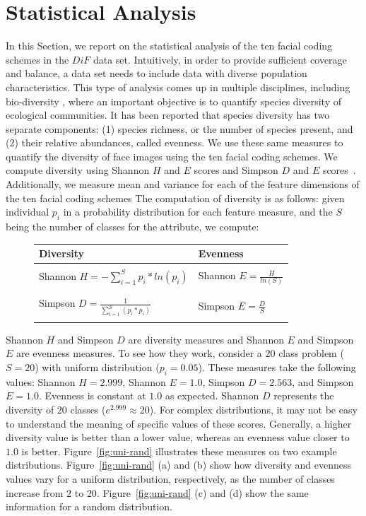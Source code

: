 \documentclass[letterpaper,11pt]{article}
\begin{document}
\section{Statistical Analysis} \label{sec:analysis}
In this Section, we report on the statistical analysis of the ten facial coding schemes in the $DiF$ data set.   Intuitively, in order to provide sufficient coverage and balance, a data set needs to include data with diverse population characteristics.  This type of analysis comes up in multiple disciplines, including bio-diversity \cite{heip_1998,hill_ecology_73}, where an important objective is to quantify species diversity of ecological communities.  It has been reported that species diversity has two separate components: (1) species richness, or the number of species present, and (2) their relative abundances, called evenness. We use these same measures to quantify the diversity of face images using the ten facial coding schemes.  We compute diversity using Shannon $H$ and $E$ scores and Simpson $D$ and $E$ scores~\cite{heip_1998}. Additionally, we measure mean and variance for each of the feature dimensions of the ten facial coding schemes  The computation of diversity is as follows: given individual $p_i$ in a probability distribution for each feature measure, and the $S$ being the number of classes for the attribute, we compute:

\begin{figure}[h]
\begin{center}
\begin{tabular}{ll}
\hline
\bf Diversity   & \bf Evenness \\\hline\\
Shannon $H = -\sum_{i=1}^{S} p_i *ln (p_i)$         &Shannon $E = \frac{H}{ln(S)}$\\\\\hline\\
Simpson $D = \frac{1}{\sum_{i=1}^{S} (p_i*p_i)}$    &Simpson $E = \frac{D}{S}$\\\\\hline
\end{tabular}
\end{center}
\end{figure}
Shannon $H$ and Simpson $D$ are diversity measures and Shannon $E$ and Simpson $E$ are evenness measures. To see how they work, consider a $20$ class problem ($S=20$) with uniform distribution ($p_i=0.05$).  These measures take the following values: Shannon $H = 2.999$, Shannon $E = 1.0$, Simpson $D = 2.563$, and Simpson $E = 1.0$.  Evenness is constant at $1.0$ as expected.  Shannon $D$ represents the diversity of $20$ classes ($e^{2.999} \approx 20$).  For complex distributions, it may not be easy to understand the meaning of specific values of these scores.  Generally, a higher diversity value is better than a lower value, whereas an evenness value closer to $1.0$ is better.  Figure~\ref{fig:uni-rand} illustrates these measures on two example distributions. Figure~\ref{fig:uni-rand} (a) and (b) show how diversity and evenness values vary for a uniform distribution, respectively, as the number of classes increase from $2$ to $20$.   Figure~\ref{fig:uni-rand} (c) and (d) show the same information for a random distribution.
\end{document}
